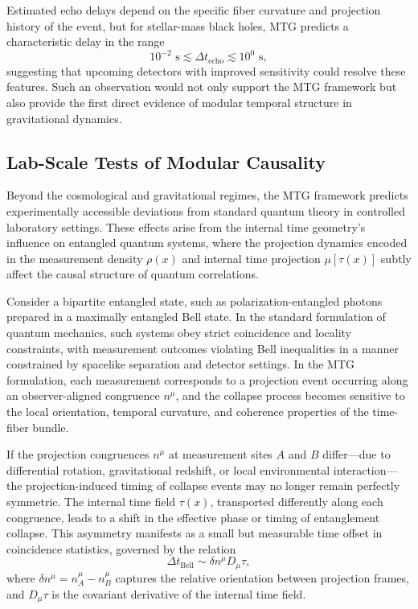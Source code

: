 \documentclass[11pt]{article}
\begin{document}
Estimated echo delays depend on the specific fiber curvature and projection history of the event, but for stellar-mass black holes, MTG predicts a characteristic delay in the range
\[
10^{-2} \text{ s} \lesssim \Delta t_{\text{echo}} \lesssim 10^0 \text{ s},
\]
suggesting that upcoming detectors with improved sensitivity could resolve these features. Such an observation would not only support the MTG framework but also provide the first direct evidence of modular temporal structure in gravitational dynamics.
\subsection{Lab-Scale Tests of Modular Causality}

Beyond the cosmological and gravitational regimes, the MTG framework predicts experimentally accessible deviations from standard quantum theory in controlled laboratory settings. These effects arise from the internal time geometry’s influence on entangled quantum systems, where the projection dynamics encoded in the measurement density \( \rho(x) \) and internal time projection \( \mu[\tau(x)] \) subtly affect the causal structure of quantum correlations.

Consider a bipartite entangled state, such as polarization-entangled photons prepared in a maximally entangled Bell state. In the standard formulation of quantum mechanics, such systems obey strict coincidence and locality constraints, with measurement outcomes violating Bell inequalities in a manner constrained by spacelike separation and detector settings. In the MTG formulation, each measurement corresponds to a projection event occurring along an observer-aligned congruence \( n^\mu \), and the collapse process becomes sensitive to the local orientation, temporal curvature, and coherence properties of the time-fiber bundle.

If the projection congruences \( n^\mu \) at measurement sites \( A \) and \( B \) differ—due to differential rotation, gravitational redshift, or local environmental interaction—the projection-induced timing of collapse events may no longer remain perfectly symmetric. The internal time field \( \tau(x) \), transported differently along each congruence, leads to a shift in the effective phase or timing of entanglement collapse. This asymmetry manifests as a small but measurable time offset in coincidence statistics, governed by the relation
\begin{equation}
\Delta t_{\text{Bell}} \sim \delta n^\mu D_\mu \tau,
\end{equation}
where \( \delta n^\mu = n_A^\mu - n_B^\mu \) captures the relative orientation between projection frames, and \( D_\mu \tau \) is the covariant derivative of the internal time field.
\end{document}
